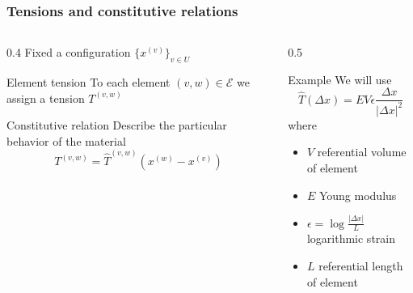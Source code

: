 \documentclass[10pt]{beamer}
\theoremstyle{definition}
\begin{document}
\begin{frame}
\frametitle{Tensions and constitutive relations}

\begin{columns}
\begin{column}{0.4\framewidth}
Fixed a configuration $\{x^{(v)}\}_{v\in U}$ \\
\begin{block}{Element tension}
To each element $(v,w)\in\mathcal{E}$ we assign a tension $T^{(v,w)}$
\end{block}
\begin{block}{Constitutive relation}
Describe the particular behavior of the material
\[
T^{(v,w)}=\hat{T}^{(v,w)}(x^{(w)}-x^{(v)})
\]
\end{block}
\end{column}
\begin{column}{0.5\framewidth}
\begin{block}{Example}
We will use
\[
\hat{T}(\Delta x)=EV\epsilon\frac{\Delta x}{|\Delta x|^2}
\]
where
\begin{itemize}
\item $V$ referential volume of element
\item  $E$ Young modulus
\item $\epsilon=\log\frac{|\Delta x|}{L}$ logarithmic strain
\item $L$ referential length of element
\end{itemize}
\end{block}
\end{column}
\end{columns}

\end{frame}
\end{document}
